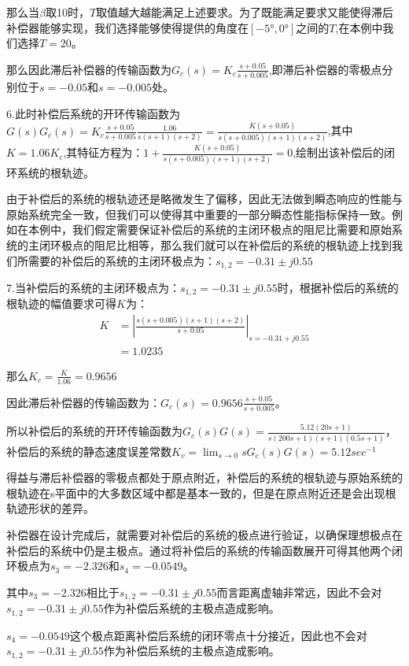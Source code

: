 \documentclass{article}
\numberwithin{equation}{section}
\numberwithin{figure}{section}
\begin{document}
那么当$\beta$取10时，$T$取值越大越能满足上述要求。为了既能满足要求又能使得滞后补偿器能够实现，我们选择能够使得提供的角度在$[-5°,0°]$之间的$T$,在本例中我们选择$T=20$。

那么因此滞后补偿器的传输函数为$G_c(s)=K_c\frac{s+0.05}{s+0.005}$,即滞后补偿器的零极点分别位于$s=-0.05$和$s=-0.005$处。

6.此时补偿后系统的开环传输函数为$G(s)G_c(s)=K_c\frac{s+0.05}{s+0.005}\frac{1.06}{s(s+1)(s+2)}=\frac{K(s+0.05)}{s(s+0.005)(s+1)(s+2)}$,其中$K=1.06K_c$,其特征方程为：$1+\frac{K(s+0.05)}{s(s+0.005)(s+1)(s+2)}=0$,绘制出该补偿后的闭环系统的根轨迹。

由于补偿后的系统的根轨迹还是略微发生了偏移，因此无法做到瞬态响应的性能与原始系统完全一致，但我们可以使得其中重要的一部分瞬态性能指标保持一致。例如在本例中，我们假定需要保证补偿后的系统的主闭环极点的阻尼比需要和原始系统的主闭环极点的阻尼比相等，那么我们就可以在补偿后的系统的根轨迹上找到我们所需要的补偿后的系统的主闭环极点为：$s_{1,2}=-0.31 \pm j0.55$

7.当补偿后的系统的主闭环极点为：$s_{1,2}=-0.31 \pm j0.55$时，根据补偿后的系统的根轨迹的幅值要求可得$K$为：
\begin{equation}
    \begin{split}
        K&=|\frac{s(s+0.005)(s+1)(s+2)}{s+0.05}|_{s=-0.31+j0.55}\\
        &=1.0235
    \end{split}
\end{equation}

那么$K_c=\frac{K}{1.06}=0.9656$

因此滞后补偿器的传输函数为：$G_c(s)=0.9656\frac{s+0.05}{s+0.005}$。

所以补偿后的系统的开环传输函数为$G_c(s)G(s)=\frac{5.12(20s+1)}{s(200s+1)(s+1)(0.5s+1)}$，补偿后的系统的静态速度误差常数$K_v=\lim_{s\rightarrow 0}sG_c(s)G(s)=5.12sec^{-1}$

得益与滞后补偿器的零极点都处于原点附近，补偿后的系统的根轨迹与原始系统的根轨迹在s平面中的大多数区域中都是基本一致的，但是在原点附近还是会出现根轨迹形状的差异。

补偿器在设计完成后，就需要对补偿后的系统的极点进行验证，以确保理想极点在补偿后的系统中仍是主极点。通过将补偿后的系统的传输函数展开可得其他两个闭环极点为$s_3=-2.326$和$s_4=-0.0549$。

其中$s_3=-2.326$相比于$s_{1,2}=-0.31 \pm j0.55$而言距离虚轴非常远，因此不会对$s_{1,2}=-0.31 \pm j0.55$作为补偿后系统的主极点造成影响。

$s_4=-0.0549$这个极点距离补偿后系统的闭环零点十分接近，因此也不会对$s_{1,2}=-0.31 \pm j0.55$作为补偿后系统的主极点造成影响。
\end{document}
